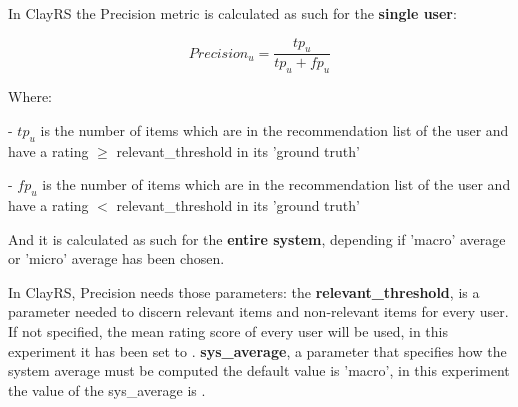 \documentclass[12pt, a4paper]{article}
\begin{document}



\hfill\break
In ClayRS the Precision metric is calculated as such for the \textbf{single user}:

    \[
    Precision_u = \frac{tp_u}{tp_u + fp_u}
    \]

    Where:

    - $tp_u$ is the number of items which are in the recommendation list of the user and have a
      rating $\geq$ relevant\_threshold in its 'ground truth'

    - $fp_u$ is the number of items which are in the recommendation list of the user and have a
      rating $<$ relevant\_threshold in its 'ground truth'
    \hfill\break


    And it is calculated as such for the \textbf{entire system}, depending if 'macro' average or 'micro' average has been
    chosen.

In ClayRS, Precision needs those parameters:
\hfill\break
the \textbf{relevant\_threshold}, is a parameter needed to discern relevant items and non-relevant items for every user.
If not specified, the mean rating score of every user will be used, in this experiment it has been set to
\textbf{}.
\hfill\break\hfill\break
\textbf{sys\_average}, a parameter that specifies how the system average must be computed the default value is 'macro',
in this experiment the value of the sys\_average is \textbf{}.
\end{document}
